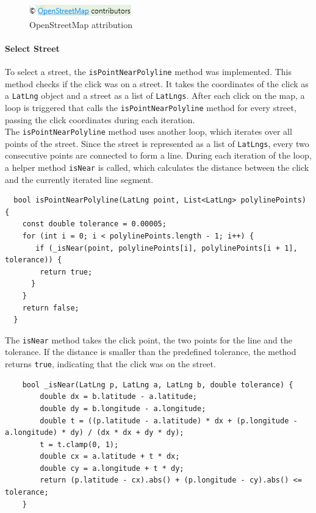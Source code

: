 \begin{figure}[H]
    \centering
    \includegraphics[width=0.2\linewidth]{images/AdminPanel/Openstreetmapverweis.png}
    \caption{OpenStreetMap attribution}
\end{figure}




\paragraph{Select Street}
\label{fig:Select Street}

To select a street, the \texttt{isPointNearPolyline} method was implemented. This method checks if the click was on a street. It takes the coordinates of the click as a \texttt{LatLng} object and a street as a list of \texttt{LatLngs}. After each click on the map, a loop is triggered that calls the \texttt{isPointNearPolyline} method for every street, passing the click coordinates during each iteration.\\

The \texttt{isPointNearPolyline} method uses another loop, which iterates over all points of the street. Since the street is represented as a list of \texttt{LatLngs}, every two consecutive points are connected to form a line. During each iteration of the loop, a helper method \texttt{isNear} is called, which calculates the distance between the click and the currently iterated line segment.


\lstset{style=mycsharp, caption=isPointNearPolyline method}
\begin{lstlisting}
  bool isPointNearPolyline(LatLng point, List<LatLng> polylinePoints) {
    const double tolerance = 0.00005;
    for (int i = 0; i < polylinePoints.length - 1; i++) {
       if (_isNear(point, polylinePoints[i], polylinePoints[i + 1], tolerance)) {
        return true;
      }
    }
    return false;
  }
\end{lstlisting}

The \texttt{isNear} method takes the click point, the two points for the line and the tolerance. If the distance is smaller than the predefined tolerance, the method returns \texttt{true}, indicating that the click was on the street.

\lstset{style=mycsharp, caption=isNear method}
\begin{lstlisting}
    bool _isNear(LatLng p, LatLng a, LatLng b, double tolerance) {
        double dx = b.latitude - a.latitude;
        double dy = b.longitude - a.longitude;
        double t = ((p.latitude - a.latitude) * dx + (p.longitude - a.longitude) * dy) / (dx * dx + dy * dy); 
        t = t.clamp(0, 1);
        double cx = a.latitude + t * dx;
        double cy = a.longitude + t * dy;
        return (p.latitude - cx).abs() + (p.longitude - cy).abs() <= tolerance;
    }
\end{lstlisting}



